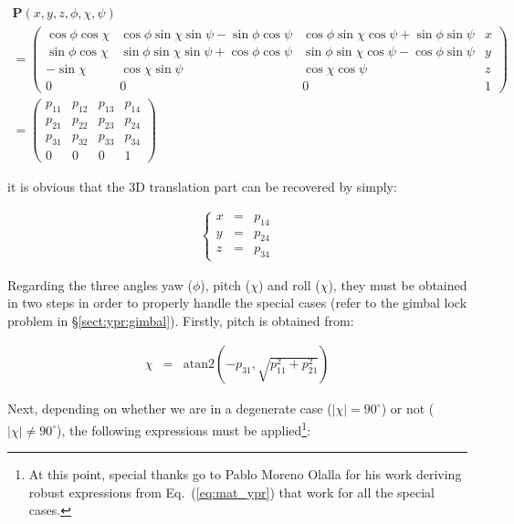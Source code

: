 \documentclass[a4paper,11pt]{report}
\begin{document}
\begin{equation*}
\begin{array}{l}
\mathbf{P}(x,y,z,\phi,\chi,\psi)  \\
=\left(
  \begin{array}{ccc|c}
   \cos \phi \cos \chi  & \cos \phi \sin \chi \sin \psi - \sin \phi \cos \psi   & \cos \phi \sin \chi \cos \psi + \sin \phi \sin \psi & x \\
   \sin \phi \cos \chi  & \sin \phi \sin \chi \sin \psi + \cos \phi \cos \psi  &  \sin \phi \sin \chi \cos \psi - \cos \phi \sin \psi & y \\
   -\sin \chi & \cos \chi \sin \psi  &  \cos \chi \cos \psi & z \\ \hline
   0 & 0 & 0& 1
  \end{array}
\right) \\
=\left(
  \begin{array}{ccc|c}
   p_{11} & p_{12}& p_{13}& p_{14} \\
   p_{21} & p_{22}& p_{23}& p_{24} \\
   p_{31} & p_{32}& p_{33}& p_{34} \\
   0 & 0 & 0& 1
  \end{array}
\right)
\end{array}
\end{equation*}

\noindent it is obvious that the 3D translation part can be recovered by simply:

\begin{eqnarray*}
 \left\{
  \begin{array}{rcl}
    x &=& p_{14} \\
    y &=& p_{24} \\
    z &=& p_{34} 
  \end{array}
  \right.
\end{eqnarray*}

Regarding the three angles yaw ($\phi$), pitch ($\chi$) and roll ($\chi$), they must be obtained 
in two steps in order to properly handle the special cases 
(refer to the gimbal lock problem in \S \ref{sect:ypr:gimbal}).
Firstly, pitch is obtained from:

\begin{eqnarray}
  \chi &=& \mathrm{atan2} \left( -p_{31} , \sqrt{ p_{11}^2 + p_{21}^2 } \right) 
\end{eqnarray}

Next, depending on whether we are in a degenerate case ($|\chi|=90^\circ$) or 
not ($|\chi| \neq 90^\circ$), the following expressions must
be applied\footnote{At this point, special thanks go to 
Pablo Moreno Olalla for his work deriving robust expressions from Eq.~(\ref{eq:mat_ypr}) 
that work for all the special cases.}:
\end{document}
